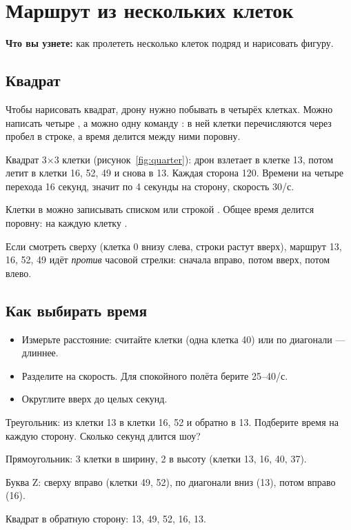\chapter{Маршрут из нескольких клеток}\label{ch:marshrut}

\textbf{Что вы узнете:} как пролететь несколько клеток подряд и нарисовать фигуру.

\section{Квадрат}

Чтобы нарисовать квадрат, дрону нужно побывать в четырёх клетках. Можно написать четыре , а можно одну команду : в ней клетки перечисляются через пробел в строке, а время делится между ними поровну.


Квадрат 3$\times$3 клетки (рисунок~\ref{fig:quarter}): дрон взлетает в клетке 13, потом летит в клетки 16, 52, 49 и снова в 13. Каждая сторона 120\cm. Времени на четыре перехода 16 секунд, значит по 4 секунды на сторону, скорость 30\cm/с.

\begin{zametka}
Клетки в  можно записывать списком \kod{[16, 52, 49, 13]} или строкой . Общее время делится поровну: на каждую клетку .
\end{zametka}

\begin{vnimanie}[Направление]
Если смотреть сверху (клетка 0 внизу слева, строки растут вверх), маршрут 13, 16, 52, 49 идёт \emph{против} часовой стрелки: сначала вправо, потом вверх, потом влево.
\end{vnimanie}

\section{Как выбирать время}

\begin{itemize}
  \item Измерьте расстояние: считайте клетки (одна клетка 40\cm) или по диагонали — длиннее.
  \item Разделите на скорость. Для спокойного полёта берите 25–40\cm/с.
  \item Округлите вверх до целых секунд.
\end{itemize}

\begin{probuy}
  \item Треугольник: из клетки 13 в клетки 16, 52 и обратно в 13. Подберите время на каждую сторону. Сколько секунд длится шоу?
  \item Прямоугольник: 3 клетки в ширину, 2 в высоту (клетки 13, 16, 40, 37).
  \item Буква Z: сверху вправо (клетки 49, 52), по диагонали вниз (13), потом вправо (16).
  \item Квадрат в обратную сторону: 13, 49, 52, 16, 13.
\end{probuy}

